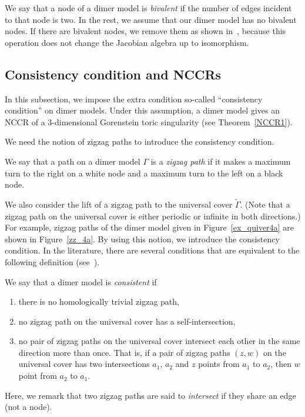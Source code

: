 We say that a node of a dimer model is \emph{bivalent} if the number of edges incident to that node is two. In the rest, we assume that our dimer model has no bivalent nodes. If there are bivalent nodes, we remove them as shown in~\cite[Figure~5.1]{IU1}, because this operation does not change the Jacobian algebra up to isomorphism.


\subsection{Consistency condition and NCCRs}\label{sec_consist}

In this subsection, we impose the extra condition so-called ``consistency condition'' on dimer models. Under this assumption, a dimer model gives an NCCR of a $3$-dimensional Gorenstein toric singularity (see Theorem~\ref{NCCR1}).

We need the notion of zigzag paths to introduce the consistency condition.

\begin{defi}
We say that a path on a dimer model $\Gamma$ is a \emph{zigzag path} if it makes a maximum turn to the right on a white node and a maximum turn to the left on a black node.
\end{defi}

We also consider the lift of a zigzag path to the universal cover $\widetilde{\Gamma}$. (Note that a zigzag path on the universal cover is either periodic or infinite in both directions.) For example, zigzag paths of the dimer model given in Figure~\ref{ex_quiver4a} are shown in Figure~\ref{zz_4a}. By using this notion, we introduce the consistency condition. In the literature, there are several conditions that are equivalent to the following definition (see~\cite{Boc1,IU1}).

\begin{defi}\label{def_consistent}
We say that a dimer model is \emph{consistent} if
\begin{enumerate}[\rm(1)]
\item there is no homologically trivial zigzag path,
\item no zigzag path on the universal cover has a self-intersection,
\item no pair of zigzag paths on the universal cover intersect each other in the same direction more than once. That is, if a pair of zigzag paths $(z,w)$ on the universal cover has two intersections $a_1$, $a_2$ and $z$ points from $a_1$ to $a_2$, then $w$ point from $a_2$ to $a_1$.
\end{enumerate}
Here, we remark that two zigzag paths are said to \emph{intersect} if they share an edge (not a node).
\end{defi}


